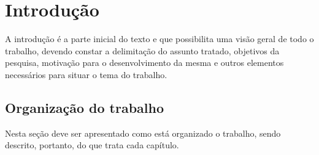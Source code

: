 \chapter{Introdução}

A introdução é a parte inicial do texto e que possibilita uma visão geral de todo o trabalho, devendo constar a delimitação do assunto tratado, objetivos da pesquisa, motivação para o desenvolvimento da mesma e outros elementos necessários para situar o tema do trabalho.

\section{Organização do trabalho}

Nesta seção deve ser apresentado como está organizado o trabalho, sendo descrito, portanto, do que trata cada capítulo.